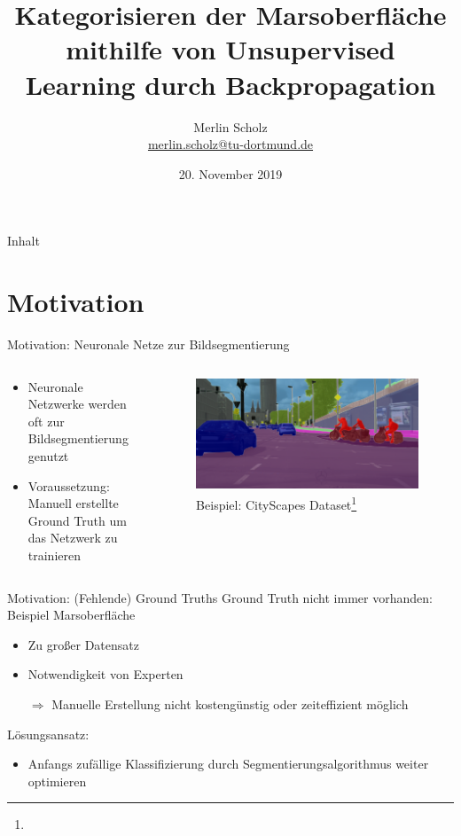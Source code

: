 \documentclass[9pt]{beamer}
\author[Merlin Scholz]{Merlin Scholz\\\href{mailto:merlin.scholz@tu-dortmund.de}{merlin.scholz@tu-dortmund.de}}
\title[Analyse der Marsoberfläche durch Unsupervised Learning]{Kategorisieren der Marsoberfläche mithilfe von Unsupervised Learning durch Backpropagation}
\date[20.11.2019]{20. November 2019}
\institute[TU Dortmund]{Mustererkennung,\\ Informatik XII, Technische Universität Dortmund}
\providecommand{\fcite}[1]{\footnote{\bibentry{#1}}}
\begin{document}
\begin{frame}
	\titlepage
\end{frame}

\begin{frame}{Inhalt}
	\tableofcontents
\end{frame}

\section{Motivation}

\begin{frame}{Motivation: Neuronale Netze zur Bildsegmentierung}
\begin{columns}
	\begin{column}{.5\textwidth}
		\begin{itemize}
			\item Neuronale Netzwerke werden oft zur Bildsegmentierung genutzt
			\item Voraussetzung: Manuell erstellte Ground Truth um das Netzwerk zu trainieren
			\end{itemize}
	\end{column}
	\begin{column}{.5\textwidth}
		\begin{figure}[H]
			\includegraphics[width=\textwidth,keepaspectratio]{koeln00.png}
			\caption{Beispiel: CityScapes Dataset\fcite{Cordts_2016_CVPR}}
		\end{figure}
	\end{column}
\end{columns}
\end{frame}

\begin{frame}{Motivation: (Fehlende) Ground Truths}
Ground Truth nicht immer vorhanden: Beispiel Marsoberfläche
\begin{itemize}
	\item Zu großer Datensatz
	\item Notwendigkeit von Experten
	\item[$\Rightarrow$] Manuelle Erstellung nicht kostengünstig oder zeiteffizient möglich
\end{itemize}
\medskip
Lösungsansatz:
\begin{itemize}
	\item Anfangs zufällige Klassifizierung durch Segmentierungsalgorithmus weiter optimieren
\end{itemize}
\end{frame}
\end{document}
